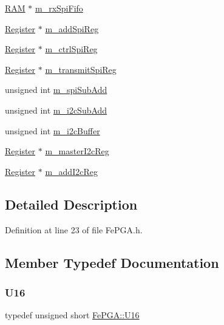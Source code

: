\begin{DoxyCompactItemize}
\item 
\hyperlink{classRAM}{R\+AM} $\ast$ \hyperlink{classFePGA_a3ee7f973bfad39b48bbc1a185e9ffaec}{m\+\_\+rx\+Spi\+Fifo}
\item 
\hyperlink{classRegister}{Register} $\ast$ \hyperlink{classFePGA_a569eb8410924bec1c8279ca80dc37a6a}{m\+\_\+add\+Spi\+Reg}
\item 
\hyperlink{classRegister}{Register} $\ast$ \hyperlink{classFePGA_a8fb76733a688dff6d91892a49a97a21f}{m\+\_\+ctrl\+Spi\+Reg}
\item 
\hyperlink{classRegister}{Register} $\ast$ \hyperlink{classFePGA_a003ee241fb5f32fb3442174db3fe6f49}{m\+\_\+transmit\+Spi\+Reg}
\item 
unsigned int \hyperlink{classFePGA_a4f2f5d175aeb6dcaf497f81d2f075411}{m\+\_\+spi\+Sub\+Add}
\item 
unsigned int \hyperlink{classFePGA_aba8c2c8d8e0d136826b9dd4c2d7c2e90}{m\+\_\+i2c\+Sub\+Add}
\item 
unsigned int \hyperlink{classFePGA_a173664ffd6a73f454ae31f51e689dd16}{m\+\_\+i2c\+Buffer}
\item 
\hyperlink{classRegister}{Register} $\ast$ \hyperlink{classFePGA_adb390ea8de4a6cbce648dc62e4405f32}{m\+\_\+master\+I2c\+Reg}
\item 
\hyperlink{classRegister}{Register} $\ast$ \hyperlink{classFePGA_af3ef3467ba803e6d3b970ea8982d6246}{m\+\_\+add\+I2c\+Reg}
\end{DoxyCompactItemize}


\subsection{Detailed Description}


Definition at line 23 of file Fe\+P\+G\+A.\+h.



\subsection{Member Typedef Documentation}
\mbox{\label{classFePGA_ac84b20a342a6c963cba061c8bdc37651}} 
\subsubsection{\texorpdfstring{U16}{U16}}
{\footnotesize\ttfamily typedef unsigned short \hyperlink{classFePGA_ac84b20a342a6c963cba061c8bdc37651}{Fe\+P\+G\+A\+::\+U16}}



